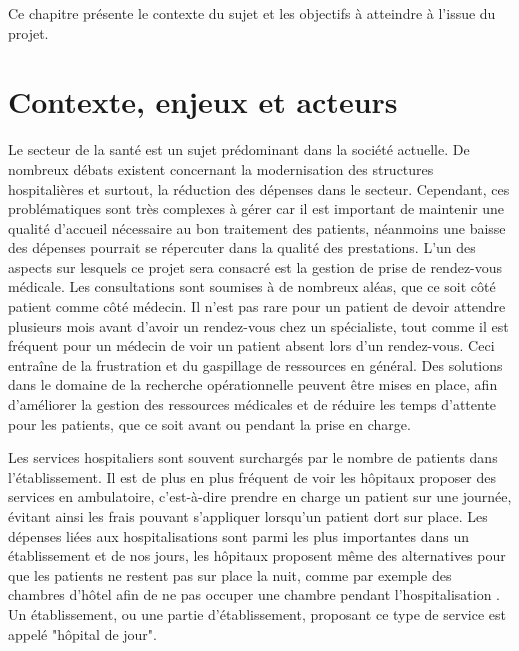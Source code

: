 \documentclass{polytech/polytech}
\begin{document}
Ce chapitre présente le contexte du sujet et les objectifs à atteindre à l'issue du projet.

\section{Contexte, enjeux et acteurs}


Le secteur de la santé est un sujet prédominant dans la société actuelle. De nombreux débats existent concernant la modernisation des structures hospitalières et surtout, la réduction des dépenses dans le secteur. Cependant, ces problématiques sont très complexes à gérer car il est important de maintenir une qualité d'accueil nécessaire au bon traitement des patients, néanmoins une baisse des dépenses pourrait se répercuter dans la qualité des prestations. L'un des aspects sur lesquels ce projet sera consacré est la gestion de prise de rendez-vous médicale. Les consultations sont soumises à de nombreux aléas, que ce soit côté patient comme côté médecin. Il n'est pas rare pour un patient de devoir attendre plusieurs mois avant d'avoir un rendez-vous chez un spécialiste, tout comme il est fréquent pour un médecin de voir un patient absent lors d'un rendez-vous. Ceci entraîne de la frustration et du gaspillage de ressources en général. Des solutions dans le domaine de la recherche opérationnelle peuvent être mises en place, afin d'améliorer la gestion des ressources médicales et de réduire les temps d'attente pour les patients, que ce soit avant ou pendant la prise en charge. 

Les services hospitaliers sont souvent surchargés par le nombre de patients dans l'établissement. Il est de plus en plus fréquent de voir les hôpitaux proposer des services en ambulatoire, c'est-à-dire prendre en charge un patient sur une journée, évitant ainsi les frais pouvant s'appliquer lorsqu'un patient dort sur place. Les dépenses liées aux hospitalisations sont parmi les plus importantes dans un établissement et de nos jours, les hôpitaux proposent même des alternatives pour que les patients ne restent pas sur place la nuit, comme par exemple des chambres d'hôtel afin de ne pas occuper une chambre pendant l'hospitalisation \cite{noauthor_chu_nodate}. Un établissement, ou une partie d'établissement, proposant ce type de service est appelé "hôpital de jour".
\end{document}
